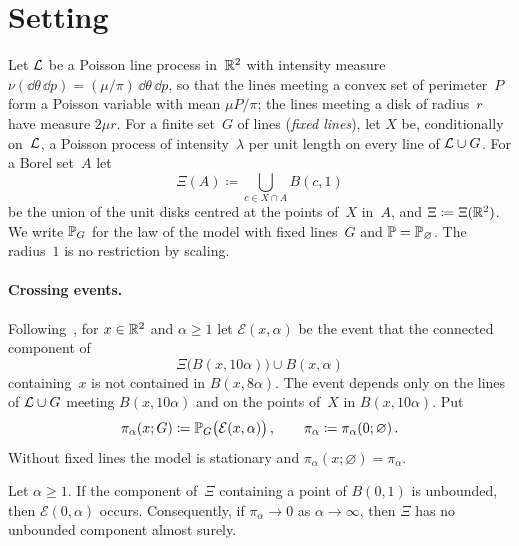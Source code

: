 \documentclass[11pt,letterpaper]{article}
\renewcommand{\cE}{\mathcal E}
\begin{document}
\section{Setting}
\label{sec:setting}

Let $\cL$ be a Poisson line process in~$\R^2$ with intensity measure $\nu(\dd\theta\,\dd p)=(\mu/\pi)\,\dd\theta\,\dd p$, so that the lines meeting a convex set of perimeter~$P$ form a Poisson variable with mean $\mu P/\pi$; the lines meeting a disk of radius~$r$ have measure $2\mu r$. For a finite set~$G$ of lines (\emph{fixed lines}), let $X$ be, conditionally on~$\cL$, a Poisson process of intensity~$\lambda$ per unit length on every line of $\cL\cup G$. For a Borel set~$A$ let
\begin{equation*}
  \Xi(A)\coloneqq\bigcup_{c\in X\cap A}B(c,1)
\end{equation*}
be the union of the unit disks centred at the points of~$X$ in~$A$, and $\Xi\coloneqq\Xi(\R^2)$. We write $\P_G$ for the law of the model with fixed lines~$G$ and $\P=\P_\varnothing$. The radius~$1$ is no restriction by scaling.

\paragraph{Crossing events.} Following~\cite{Gou08}, for $x\in\R^2$ and $\alpha\ge1$ let $\cE(x,\alpha)$ be the event that the connected component of
\begin{equation*}
  \Xi\bigl(B(x,10\alpha)\bigr)\cup B(x,\alpha)
\end{equation*}
containing~$x$ is not contained in $B(x,8\alpha)$. The event depends only on the lines of $\cL\cup G$ meeting $B(x,10\alpha)$ and on the points of~$X$ in $B(x,10\alpha)$. Put
\begin{equation}
\label{eq:pi}
  \pi_\alpha(x;G)\coloneqq\P_G\bigl(\cE(x,\alpha)\bigr)\,,\qquad\pi_\alpha\coloneqq\pi_\alpha(0;\varnothing)\,.
\end{equation}
Without fixed lines the model is stationary and $\pi_\alpha(x;\varnothing)=\pi_\alpha$.

\begin{lemma}
\label{lem:perc}
Let $\alpha\ge1$. If the component of~$\Xi$ containing a point of $B(0,1)$ is unbounded, then $\cE(0,\alpha)$ occurs. Consequently, if $\pi_\alpha\to0$ as $\alpha\to\infty$, then $\Xi$ has no unbounded component almost surely.
\end{lemma}
\end{document}

